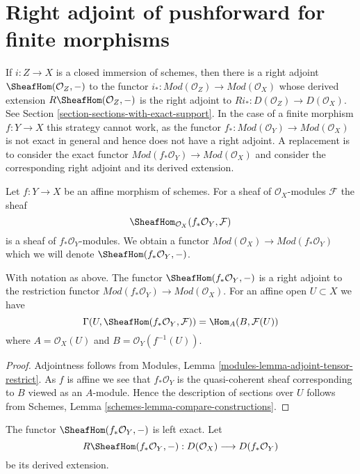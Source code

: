 \section{Right adjoint of pushforward for finite morphisms}
\label{section-duality-finite}

\noindent
If $i : Z \to X$ is a closed immersion of schemes, then there is
a right adjoint $\SheafHom(\mathcal{O}_Z, -)$ to the functor
$i_* : \textit{Mod}(\mathcal{O}_Z) \to \textit{Mod}(\mathcal{O}_X)$
whose derived extension $R\SheafHom(\mathcal{O}_Z, -)$
is the right adjoint to $Ri_* : D(\mathcal{O}_Z) \to D(\mathcal{O}_X)$. See
Section \ref{section-sections-with-exact-support}.
In the case of a finite morphism $f : Y \to X$ this strategy
cannot work, as the functor
$f_* : \textit{Mod}(\mathcal{O}_Y) \to \textit{Mod}(\mathcal{O}_X)$
is not exact in general and hence does not have a right adjoint.
A replacement is to consider the exact functor
$\textit{Mod}(f_*\mathcal{O}_Y) \to \textit{Mod}(\mathcal{O}_X)$
and consider the corresponding right adjoint and its derived
extension.

\medskip\noindent
Let $f : Y \to X$ be an affine morphism of schemes. For a sheaf
of $\mathcal{O}_X$-modules $\mathcal{F}$ the sheaf
$$
\SheafHom_{\mathcal{O}_X}(f_*\mathcal{O}_Y, \mathcal{F})
$$
is a sheaf of $f_*\mathcal{O}_Y$-modules. We obtain a functor
$\textit{Mod}(\mathcal{O}_X) \to \textit{Mod}(f_*\mathcal{O}_Y)$
which we will denote $\SheafHom(f_*\mathcal{O}_Y, -)$.

\begin{lemma}
\label{lemma-compute-sheafhom-affine}
With notation as above. The functor $\SheafHom(f_*\mathcal{O}_Y, -)$ is a
right adjoint to the restriction functor
$\textit{Mod}(f_*\mathcal{O}_Y) \to \textit{Mod}(\mathcal{O}_X)$.
For an affine open $U \subset X$ we have
$$
\Gamma(U, \SheafHom(f_*\mathcal{O}_Y, \mathcal{F})) =
\Hom_A(B, \mathcal{F}(U))
$$
where $A = \mathcal{O}_X(U)$ and $B = \mathcal{O}_Y(f^{-1}(U))$.
\end{lemma}

\begin{proof}
Adjointness follows from
Modules, Lemma \ref{modules-lemma-adjoint-tensor-restrict}.
As $f$ is affine we see that $f_*\mathcal{O}_Y$ is
the quasi-coherent sheaf corresponding to $B$ viewed
as an $A$-module. Hence the description of sections over $U$ follows from
Schemes, Lemma \ref{schemes-lemma-compare-constructions}.
\end{proof}

\noindent
The functor $\SheafHom(f_*\mathcal{O}_Y, -)$ is left exact. Let
$$
R\SheafHom(f_*\mathcal{O}_Y, -) :
D(\mathcal{O}_X)
\longrightarrow
D(f_*\mathcal{O}_Y)
$$
be its derived extension.


